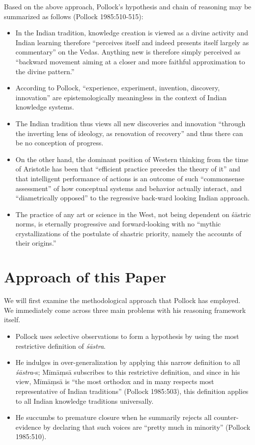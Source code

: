 Based on the above approach, Pollock's hypothesis and chain of reasoning may be summarized as follows (Pollock 1985:510-515): 
\begin{itemize}
\item In the Indian tradition, knowledge creation is viewed as a divine activity and Indian learning therefore ``perceives itself and indeed presents itself largely as commentary'' on the Vedas. Anything new is therefore simply perceived as ``backward movement aiming at a closer and more faithful approximation to the divine pattern.''

\item According to Pollock, ``experience, experiment, invention, discovery, innovation'' are epistemologically meaningless in the context of Indian knowledge systems.

\item The Indian tradition thus views all new discoveries and innovation ``through the inverting lens of ideology, as renovation of recovery'' and thus there can be no conception of progress.

\item On the other hand, the dominant position of Western thinking from the time of Aristotle has been that ``efficient practice precedes the theory of it'' and that intelligent performance of actions is an outcome of such ``commonsense assessment'' of how conceptual systems and behavior actually interact, and ``diametrically opposed'' to the regressive back-ward looking Indian approach. 

\item The practice of any art or science in the West, not being dependent on śāstric norms, is eternally progressive and forward-looking with no ``mythic crystallizations of the postulate of shastric priority, namely the accounts of their origins.''
\end{itemize}

\section*{Approach of this Paper}

We will first examine the methodological approach that Pollock has employed. We immediately come across three main problems with his reasoning framework itself. 
\begin{itemize}
\item Pollock uses selective observations to form a hypothesis by using the most restrictive definition of {\sl śāstra}.
\item He indulges in over-generalization by applying this narrow definition to all {\sl śāstra}-s; Mīmāṃsā subscribes to this restrictive definition, and since in his view, Mīmāṃsā is ``the most orthodox and in many respects most representative of Indian traditions'' (Pollock 1985:503), this definition applies to all Indian knowledge traditions universally.
\item He succumbs to premature closure when he summarily rejects all counter-evidence by declaring that such voices are ``pretty much in minority'' (Pollock 1985:510).
\end{itemize}

